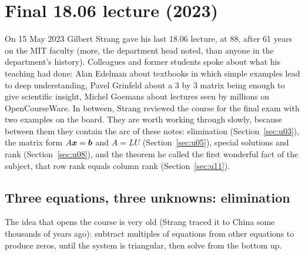\section{Final 18.06 lecture (2023)}\label{sec:u41}

On 15 May 2023 Gilbert Strang gave his last 18.06 lecture, at 88, after 61 years on the MIT faculty (more, the department head noted, than anyone in the department's history). Colleagues and former students spoke about what his teaching had done: Alan Edelman about textbooks in which simple examples lead to deep understanding, Pavel Grinfeld about a 3 by 3 matrix being enough to give scientific insight, Michel Goemans about lectures seen by millions on OpenCourseWare. In between, Strang reviewed the course for the final exam with two examples on the board. They are worth working through slowly, because between them they contain the arc of these notes: elimination (Section~\ref{sec:u03}), the matrix form $A\boldsymbol{x}=\boldsymbol{b}$ and $A=LU$ (Section~\ref{sec:u05}), special solutions and rank (Section~\ref{sec:u08}), and the theorem he called the first wonderful fact of the subject, that row rank equals column rank (Section~\ref{sec:u11}).

\subsection{Three equations, three unknowns: elimination}

The idea that opens the course is very old (Strang traced it to China some thousands of years ago): subtract multiples of equations from other equations to produce zeros, until the system is triangular, then solve from the bottom up.

